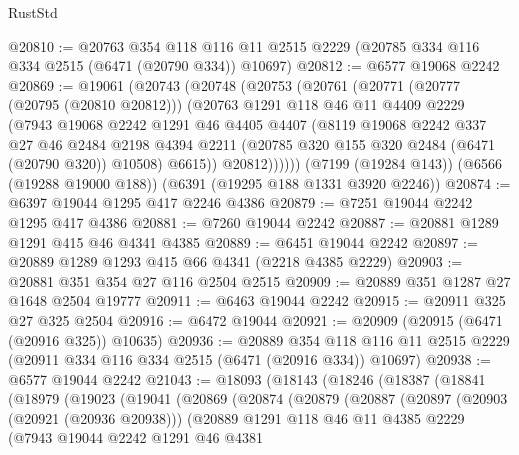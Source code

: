 \begin{lexlean}{RustStd}
\begin{coremodule}
{\begin{coremodule}
{{{{{{{{{{{{{{{{{{{{{{{{{{@20810 := @20763
    @354
    @118
    @116
    @11
    @2515
    @2229
    (@20785 @334 @116 @334 @2515 (@6471 (@20790 @334)) @10697)
@20812 := @6577 @19068 @2242
@20869 := @19061
    (@20743
      (@20748
        (@20753
          (@20761
            (@20771
              (@20777 (@20795 (@20810 @20812)))
              (@20763
                @1291
                @118
                @46
                @11
                @4409
                @2229
                (@7943
                  @19068
                  @2242
                  @1291
                  @46
                  @4405
                  @4407
                  (@8119
                    @19068
                    @2242
                    @337
                    @27
                    @46
                    @2484
                    @2198
                    @4394
                    @2211
                    (@20785 @320 @155 @320 @2484 (@6471 (@20790 @320)) @10508)
                    @6615))
                @20812))))))
    (@7199 (@19284 @143))
    (@6566 (@19288 @19000 @188))
    (@6391 (@19295 @188 @1331 @3920 @2246))
@20874 := @6397 @19044 @1295 @417 @2246 @4386
@20879 := @7251 @19044 @2242 @1295 @417 @4386
@20881 := @7260 @19044 @2242
@20887 := @20881 @1289 @1291 @415 @46 @4341 @4385
@20889 := @6451 @19044 @2242
@20897 := @20889 @1289 @1293 @415 @66 @4341 (@2218 @4385 @2229)
@20903 := @20881 @351 @354 @27 @116 @2504 @2515
@20909 := @20889 @351 @1287 @27 @1648 @2504 @19777
@20911 := @6463 @19044 @2242
@20915 := @20911 @325 @27 @325 @2504
@20916 := @6472 @19044
@20921 := @20909 (@20915 (@6471 (@20916 @325)) @10635)
@20936 := @20889
    @354
    @118
    @116
    @11
    @2515
    @2229
    (@20911 @334 @116 @334 @2515 (@6471 (@20916 @334)) @10697)
@20938 := @6577 @19044 @2242
@21043 := @18093
    (@18143
      (@18246
        (@18387
          (@18841
            (@18979
              (@19023
                (@19041
                  (@20869
                    (@20874
                      (@20879
                        (@20887
                          (@20897
                            (@20903 (@20921 (@20936 @20938)))
                            (@20889
                              @1291
                              @118
                              @46
                              @11
                              @4385
                              @2229
                              (@7943
                                @19044
                                @2242
                                @1291
                                @46
                                @4381
}}}}}}}}}}}}}}}}}}}}}}}}}}
\end{coremodule}}
\end{coremodule}
\end{lexlean}
